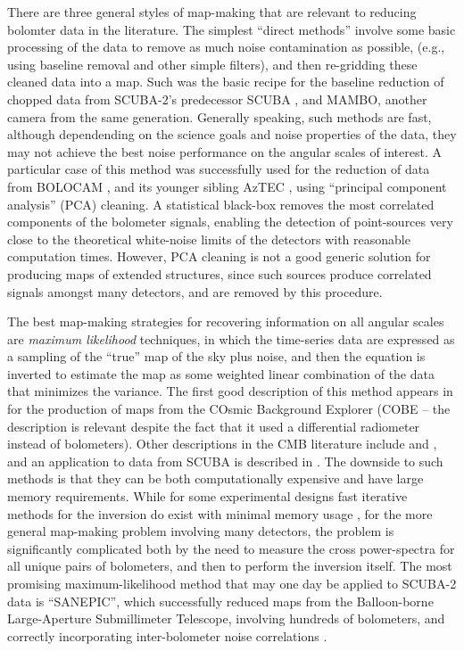 \documentclass[useAMS,usenatbib,nofootinbib]{mn2e}
\begin{document}
There are three general styles of map-making that are relevant to
reducing bolomter data in the literature. The simplest ``direct
methods'' involve some basic processing of the data to remove as much
noise contamination as possible, (e.g., using baseline removal and
other simple filters), and then re-gridding these cleaned data into a
map. Such was the basic recipe for the baseline reduction of chopped
data from SCUBA-2's predecessor SCUBA
\citep{1998ASPC..145..216J,2000ASPC..216..559J}, and MAMBO, another
camera from the same generation. Generally speaking, such methods are
fast, although dependending on the science goals and noise properties
of the data, they may not achieve the best noise performance on the
angular scales of interest. A particular case of this method was
successfully used for the reduction of data from BOLOCAM
\citep[e.g.][]{laurent2005}, and its younger sibling AzTEC
\citep[e.g.][]{scott2008}, using ``principal component analysis''
(PCA) cleaning. A statistical black-box removes the most correlated
components of the bolometer signals, enabling the detection of
point-sources very close to the theoretical white-noise limits of the
detectors with reasonable computation times. However, PCA cleaning is
not a good generic solution for producing maps of extended structures,
since such sources produce correlated signals amongst many detectors,
and are removed by this procedure.

The best map-making strategies for recovering information on all
angular scales are \emph{maximum likelihood} techniques, in which the
time-series data are expressed as a sampling of the ``true'' map of
the sky plus noise, and then the equation is inverted to estimate the
map as some weighted linear combination of the data that minimizes the
variance.  The first good description of this method appears in
\citet{janssen1992} for the production of maps from the COsmic
Background Explorer (COBE -- the description is relevant despite the
fact that it used a differential radiometer instead of
bolometers). Other descriptions in the CMB literature include
\citet{tegmark1997} and \citet{stompor2002}, and an application to
data from SCUBA is described in \citet{borys2004}.  The downside to
such methods is that they can be both computationally expensive and
have large memory requirements. While for some experimental designs
fast iterative methods for the inversion do exist with minimal memory
usage \citep[e.g.][]{wright1996}, for the more general map-making
problem involving many detectors, the problem is significantly
complicated both by the need to measure the cross power-spectra for
all unique pairs of bolometers, and then to perform the inversion
itself. The most promising maximum-likelihood method that may one day
be applied to SCUBA-2 data is ``SANEPIC'', which successfully reduced
maps from the Balloon-borne Large-Aperture Submillimeter Telescope,
involving hundreds of bolometers, and correctly incorporating
inter-bolometer noise correlations \citep[][]{patanchon2008}.
\end{document}
